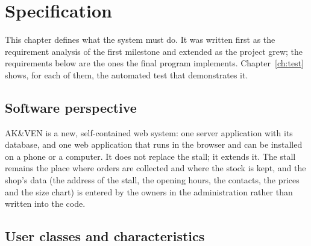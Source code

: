 \chapter{Specification}
\label{ch:spec}

This chapter defines what the system must do. It was written first as the requirement analysis of the first
milestone and extended as the project grew; the requirements below are the ones the final program implements.
Chapter~\ref{ch:test} shows, for each of them, the automated test that demonstrates it.

\section{Software perspective}

AK\&VEN is a new, self-contained web system: one server application with its database, and one web application that
runs in the browser and can be installed on a phone or a computer. It does not replace the stall; it extends it. The
stall remains the place where orders are collected and where the stock is kept, and the shop's data (the address of
the stall, the opening hours, the contacts, the prices and the size chart) is entered by the owners in the
administration rather than written into the code.

\section{User classes and characteristics}

